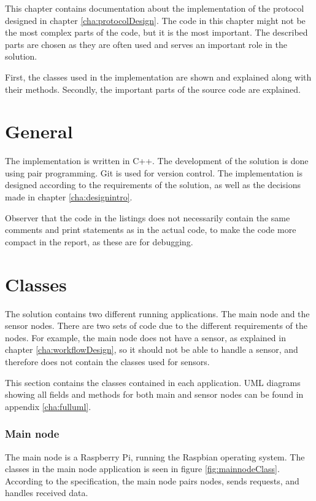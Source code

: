 This chapter contains documentation about the implementation of the protocol designed in chapter \ref{cha:protocolDesign}. The code in this chapter might not be the most complex parts of the code, but it is the most important. The described parts are chosen as they are often used and serves an important role in the solution.

First, the classes used in the implementation are shown and explained along with their methods. Secondly, the important parts of the source code are explained. 
 

\section{General}
The implementation is written in C++. The development of the solution is done using pair programming. Git is used for version control. The implementation is designed according to the requirements of the solution, as well as the decisions made in chapter \ref{cha:designintro}. 

Observer that the code in the listings does not necessarily contain the same comments and print statements as in the actual code, to make the code more compact in the report, as these are for debugging.

\section{Classes}
The solution contains two different running applications. The main node and the sensor nodes. There are two sets of code due to the different requirements of the nodes. For example, the main node does not have a sensor, as explained in chapter \ref{cha:workflowDesign}, so it should not be able to handle a sensor, and therefore does not contain the classes used for sensors.

This section contains the classes contained in each application. UML diagrams showing all fields and methods for both main and sensor nodes can be found in appendix \ref{cha:fulluml}.

\subsubsection*{Main node}
The main node is a Raspberry Pi, running the Raspbian operating system. The classes in the main node application is seen in figure \ref{fig:mainnodeClass}. 
According to the specification, the main node pairs nodes, sends requests, and handles received data.

